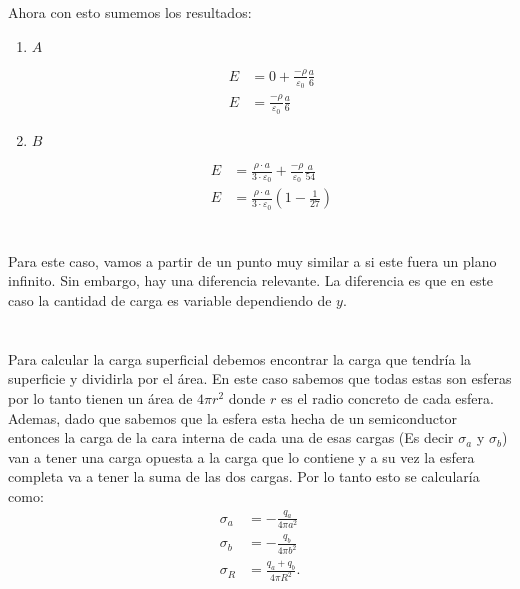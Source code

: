 \documentclass{report}
\begin{document}
Ahora con esto sumemos los resultados:
\begin{enumerate}
  \item $A$

    \begin{align*}
      E &= 0 + \frac{-\rho}{\varepsilon_0} \frac{a}{6}\\
      E &= \frac{-\rho}{\varepsilon_0} \frac{a}{6}
    \end{align*}
  \item $B$

    \begin{align*}
      E &= \frac{\rho \cdot a}{3 \cdot \varepsilon_0} + \frac{-\rho}{\varepsilon_0} \frac{a}{54} \\
      E &= \frac{\rho \cdot a}{3 \cdot \varepsilon_0}\left( 1 - \frac{1}{27} \right)
    \end{align*}
\end{enumerate}

\chapter{}

\chapter{}

Para este caso, vamos a partir de un punto muy similar a si este fuera un plano infinito. Sin embargo, hay una diferencia relevante. La diferencia es que en este caso la cantidad de carga es  variable dependiendo de $y$.

\chapter{}

\section{}

Para calcular la carga superficial debemos encontrar la carga que tendría la superficie y dividirla por el área. En este caso sabemos que todas estas son esferas por lo tanto tienen un área de $4\pi r^2$ donde $r$ es el radio concreto de cada esfera. Ademas, dado que sabemos que la esfera esta hecha de un semiconductor entonces la carga de la cara interna de cada una de esas cargas (Es decir $\sigma_a$ y $\sigma_b$) van a tener una carga opuesta a la carga que lo contiene y a su vez la esfera completa va a tener la suma de las dos cargas. Por lo tanto esto se calcularía como:
\begin{align*}
  \sigma_a &= - \frac{q_a}{4\pi a^2} \\
  \sigma_b &= - \frac{q_b}{4\pi b^2} \\
  \sigma_R &= \frac{q_a + q_b}{4\pi R^2}
.\end{align*}
\end{document}
